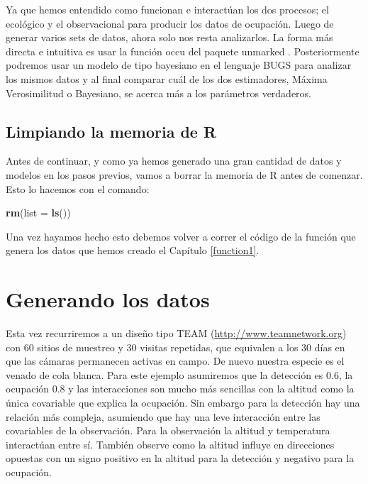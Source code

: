 \documentclass[
]{book}
\newenvironment{Shaded}{\begin{snugshade}}{\end{snugshade}}
\newcommand{\DataTypeTok}[1]{\textcolor[rgb]{0.13,0.29,0.53}{#1}}
\newcommand{\KeywordTok}[1]{\textcolor[rgb]{0.13,0.29,0.53}{\textbf{#1}}}
\newcommand{\NormalTok}[1]{#1}
\begin{document}
Ya que hemos entendido como funcionan e interactúan los dos procesos; el ecológico y el observacional para producir los datos de ocupación. Luego de generar varios sets de datos, ahora solo nos resta analizarlos. La forma más directa e intuitiva es usar la función occu del paquete unmarked \citep{Fiske2011}. Posteriormente podremos usar un modelo de tipo bayesiano en el lenguaje BUGS para analizar los mismos datos y al final comparar cuál de los dos estimadores, Máxima Verosimilitud o Bayesiano, se acerca más a los parámetros verdaderos.

\hypertarget{limpiando-la-memoria-de-r}{%
\subsection{Limpiando la memoria de R}\label{limpiando-la-memoria-de-r}}

Antes de continuar, y como ya hemos generado una gran cantidad de datos y modelos en los pasos previos, vamos a borrar la memoria de R antes de comenzar. Esto lo hacemos con el comando:

\begin{Shaded}
\begin{Highlighting}[]
\KeywordTok{rm}\NormalTok{(}\DataTypeTok{list =} \KeywordTok{ls}\NormalTok{())}
\end{Highlighting}
\end{Shaded}

Una vez hayamos hecho esto debemos volver a correr el código de la función que genera los datos que hemos creado el Capítulo \ref{function1}.

\hypertarget{generando-los-datos}{%
\section{Generando los datos}\label{generando-los-datos}}

Esta vez recurriremos a un diseño tipo TEAM (\url{http://www.teamnetwork.org}) con 60 sitios de muestreo y 30 visitas repetidas, que equivalen a los 30 días en que las cámaras permanecen activas en campo. De nuevo nuestra especie es el venado de cola blanca. Para este ejemplo asumiremos que la detección es 0.6, la ocupación 0.8 y las interacciones son mucho más sencillas con la altitud como la única covariable que explica la ocupación. Sin embargo para la detección hay una relación más compleja, asumiendo que hay una leve interacción entre las covariables de la observación. Para la observación la altitud y temperatura interactúan entre sí. También observe como la altitud influye en direcciones opuestas con un signo positivo en la altitud para la detección y negativo para la ocupación.
\end{document}
